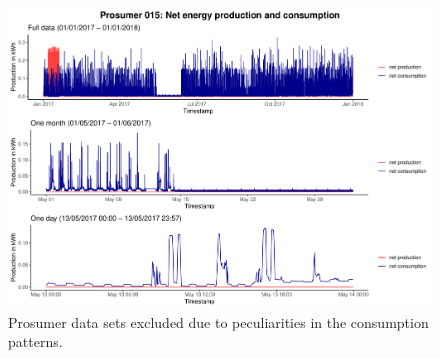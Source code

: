 \begin{centering}
\begin{figure}[!htbp]
        \includegraphics[width=\textwidth-0.85cm]{thesis/graphs/timeseries/p015_prod&cons.pdf}
        \caption[Prosumer data sets excluded due to peculiarities in the consumption patterns]{Prosumer data sets excluded due to peculiarities in the consumption patterns. \quantnet}
        \label{App:Fig:excludedpros}
\end{figure}
\end{centering}


